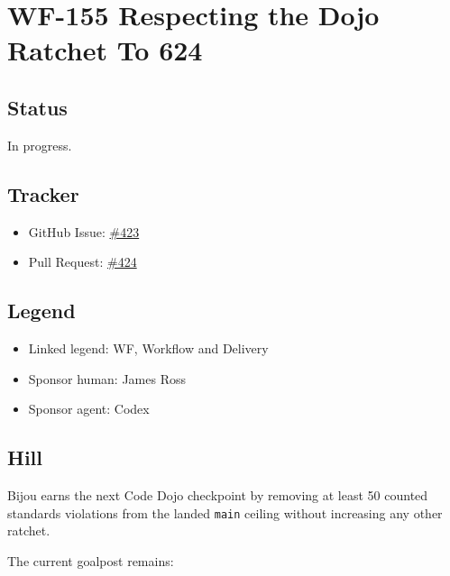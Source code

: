\chapter{WF-155 Respecting the Dojo Ratchet To 624}\label{record-237}

\smallskip

\section{Status}\label{record-237-status}

In progress.

\section{Tracker}\label{record-237-tracker}

\begin{itemize}
\tightlist
\item
  GitHub Issue: \href{https://github.com/flyingrobots/bijou/issues/423}{\#423}
\item
  Pull Request: \href{https://github.com/flyingrobots/bijou/pull/424}{\#424}
\end{itemize}

\section{Legend}\label{record-237-legend}

\begin{itemize}
\tightlist
\item
  Linked legend: WF, Workflow and Delivery
\item
  Sponsor human: James Ross
\item
  Sponsor agent: Codex
\end{itemize}

\section{Hill}\label{record-237-hill}

Bijou earns the next Code Dojo checkpoint by removing at least 50 counted standards violations from the landed \texttt{m\allowbreak{}a\allowbreak{}i\allowbreak{}n} ceiling without increasing any other ratchet.

The current goalpost remains:

